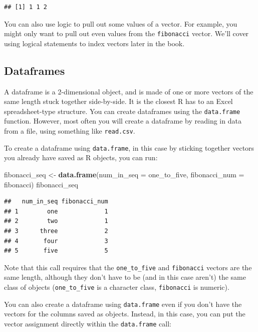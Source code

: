 \documentclass[]{book}
\makeatletter
\newenvironment{Shaded}{\begin{snugshade}}{\end{snugshade}}
\newcommand{\KeywordTok}[1]{\textcolor[rgb]{0.13,0.29,0.53}{\textbf{#1}}}
\newcommand{\DataTypeTok}[1]{\textcolor[rgb]{0.13,0.29,0.53}{#1}}
\newcommand{\StringTok}[1]{\textcolor[rgb]{0.31,0.60,0.02}{#1}}
\newcommand{\NormalTok}[1]{#1}
\newenvironment{kframe}{%
\medskip{}
\setlength{\fboxsep}{.8em}
 \def\at@end@of@kframe{}%
 \ifinner\ifhmode%
  \def\at@end@of@kframe{\end{minipage}}%
  \begin{minipage}{\columnwidth}%
 \fi\fi%
 \def\FrameCommand##1{\hskip\@totalleftmargin \hskip-\fboxsep
 \colorbox{shadecolor}{##1}\hskip-\fboxsep
     \hskip-\linewidth \hskip-\@totalleftmargin \hskip\columnwidth}%
 \MakeFramed {\advance\hsize-\width
   \@totalleftmargin\z@ \linewidth\hsize
   \@setminipage}}%
 {\par\unskip\endMakeFramed%
 \at@end@of@kframe}
\renewenvironment{Shaded}{\begin{kframe}}{\end{kframe}}
\theoremstyle{definition}
\theoremstyle{definition}
\theoremstyle{definition}
\theoremstyle{remark}
\makeatother
\begin{document}
\begin{verbatim}
## [1] 1 1 2
\end{verbatim}

You can also use logic to pull out some values of a vector. For example,
you might only want to pull out even values from the \texttt{fibonacci}
vector. We'll cover using logical statements to index vectors later in
the book.

\subsection{Dataframes}\label{dataframes}

A dataframe is a 2-dimensional object, and is made of one or more
vectors of the same length stuck together side-by-side. It is the
closest R has to an Excel spreadsheet-type structure. You can create
dataframes using the \texttt{data.frame} function. However, most often
you will create a dataframe by reading in data from a file, using
something like \texttt{read.csv}.

To create a dataframe using \texttt{data.frame}, in this case by
sticking together vectors you already have saved as R objects, you can
run:

\begin{Shaded}
\begin{Highlighting}[]
\NormalTok{fibonacci_seq <-}\StringTok{ }\KeywordTok{data.frame}\NormalTok{(}\DataTypeTok{num_in_seq =}\NormalTok{ one_to_five,}
                            \DataTypeTok{fibonacci_num =}\NormalTok{ fibonacci)}
\NormalTok{fibonacci_seq}
\end{Highlighting}
\end{Shaded}

\begin{verbatim}
##   num_in_seq fibonacci_num
## 1        one             1
## 2        two             1
## 3      three             2
## 4       four             3
## 5       five             5
\end{verbatim}

Note that this call requires that the \texttt{one\_to\_five} and
\texttt{fibonacci} vectors are the same length, although they don't have
to be (and in this case aren't) the same class of objects
(\texttt{one\_to\_five} is a character class, \texttt{fibonacci} is
numeric).

You can also create a dataframe using \texttt{data.frame} even if you
don't have the vectors for the columns saved as objects. Instead, in
this case, you can put the vector assignment directly within the
\texttt{data.frame} call:
\end{document}
